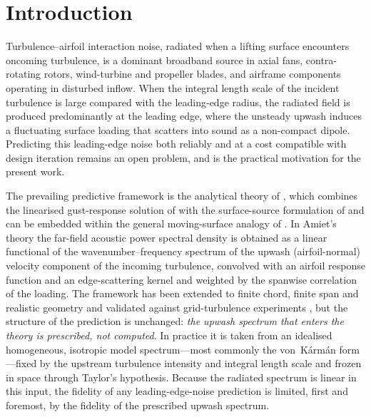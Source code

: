 \documentclass[lineno]{JFM-FLM_Au}
\begin{document}
\section{Introduction}\label{sec:intro}

Turbulence--airfoil interaction noise, radiated when a lifting surface
encounters oncoming turbulence, is a dominant broadband source in axial
fans, contra-rotating rotors, wind-turbine and propeller blades, and
airframe components operating in disturbed inflow. When the integral
length scale of the incident turbulence is large compared with the
leading-edge radius, the radiated field is produced predominantly at the
leading edge, where the unsteady upwash induces a fluctuating surface
loading that scatters into sound as a non-compact dipole. Predicting this
leading-edge noise both reliably and at a cost compatible with design
iteration remains an open problem, and is the practical motivation for the
present work.

The prevailing predictive framework is the analytical theory of
\citet{Amiet1975}, which combines the linearised gust-response solution of
\citet{Sears1941} with the surface-source formulation of \citet{Curle1955}
and can be embedded within the general moving-surface analogy of
\citet{FfowcsWilliams1969}. In Amiet's theory the far-field acoustic
power spectral density is obtained as a linear functional of the
wavenumber--frequency spectrum of the upwash (airfoil-normal) velocity
component of the incoming turbulence, convolved with an airfoil response
function and an edge-scattering kernel and weighted by the spanwise
correlation of the loading. The framework has been extended to finite
chord, finite span and realistic geometry and validated against
grid-turbulence experiments \citep{PatersonAmiet1977,RogerMoreau2010},
but the structure of the prediction is unchanged: \emph{the upwash
spectrum that enters the theory is prescribed, not computed}. In practice
it is taken from an idealised homogeneous, isotropic model spectrum---most
commonly the von~K\'arm\'an form \citep{vonKarman1948}---fixed by the
upstream turbulence intensity and integral length scale and frozen in
space through Taylor's hypothesis. Because the radiated spectrum is linear
in this input, the fidelity of any leading-edge-noise prediction is
limited, first and foremost, by the fidelity of the prescribed upwash
spectrum.
\end{document}
